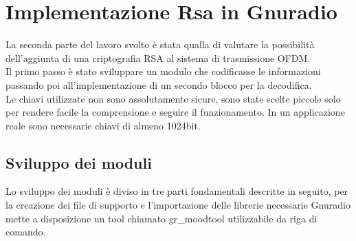 \chapter{Implementazione Rsa in Gnuradio}
\label{cha:789}
La seconda parte del lavoro svolto è stata qualla di valutare la possibilità dell'aggiunta di una criptografia RSA al sistema di trasmissione OFDM. \\Il primo passo è stato sviluppare un modulo che codificasse le informazioni passando poi all'implementazione di un secondo blocco per la decodifica.\\ Le chiavi utilizzate non sono assolutamente sicure, sono state scelte piccole solo per rendere facile la comprensione e seguire il funzionamento. In un applicazione reale sono necessarie chiavi di almeno 1024bit.
\section{Sviluppo dei moduli}
Lo sviluppo dei moduli è diviso in tre parti fondamentali descritte in seguito, per la creazione dei file di supporto e l'importazione delle librerie necessarie Gnuradio mette a disposizione un tool chiamato gr\_moodtool utilizzabile da riga di comando.
